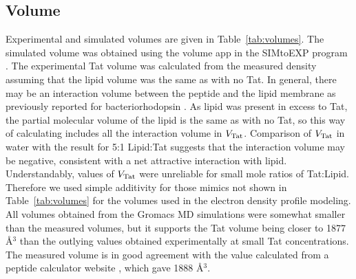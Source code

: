 \subsection{Volume}\label{sec:volume_results}
Experimental and simulated volumes are given in Table~\ref{tab:volumes}. The simulated volume was
obtained using the volume app \cite{Petrache97} in the SIMtoEXP program \cite{Kucerka10}. The experimental Tat volume was
calculated from the measured density assuming that the lipid volume was the same as with no
Tat. In general, there may be an interaction volume between the peptide and the lipid membrane
as previously reported for bacteriorhodopsin \cite{Tristram-Nagle86}. As lipid was present in excess to Tat, the
partial molecular volume of the lipid is the same as with no Tat, so this way of
calculating includes all the interaction volume in $V_\textrm{Tat}$. Comparison of $V_\textrm{Tat}$ in water with the
result for 5:1 Lipid:Tat suggests that the interaction volume may be negative, consistent with a
net attractive interaction with lipid. Understandably, values of $V_\textrm{Tat}$ were unreliable for small
mole ratios of Tat:Lipid. Therefore we used simple additivity for those mimics not shown in
Table~\ref{tab:volumes} for the volumes used in the electron density profile modeling. 
All volumes obtained from the Gromacs MD
simulations were somewhat smaller than the measured volumes, but it supports the Tat volume
being closer to 1877 \AA$^3$ than the outlying values obtained experimentally at small Tat
concentrations. The measured volume is in good agreement with the 
value calculated from a peptide calculator website \cite{peptide_calc}, which
gave 1888 \AA$^3$. 


